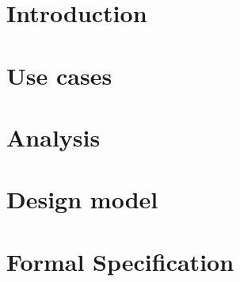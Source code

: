 \documentclass[a4paper,11pt]{article}
\begin{document}
	

	\tableofcontents
	\newpage

	\section{Introduction}
	
	\newpage
	
	\section{Use cases}
	
	\newpage
	
	\section{Analysis}
	
	\newpage
	
	\section{Design model}
	
	\newpage
	
	\section{Formal Specification}
	
	\newpage
	
\end{document}
